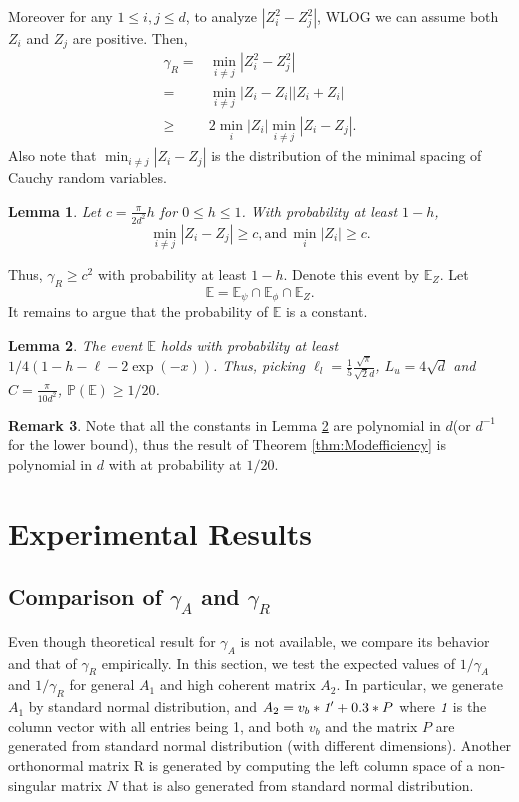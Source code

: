 \documentclass[twoside]{article}
\newcommand{\Ephione}{\mathbb{E}_{\phi_1}}
\newcommand{\Epsi}{\mathbb{E}_{\psi}}
\newcommand{\Ephi}{\mathbb{E}_{\phi}}
\newcommand{\EZ}{\mathbb{E}_{Z}}
\newcommand{\E}{\mathbb{E}}
\newcommand{\Prob}[1]{\mathbb{P}\left(#1\right)}
\newtheorem{lemma}{Lemma}[section]
\theoremstyle{definition}
\newtheorem{remark}[lemma]{Remark}
\begin{document}
Moreover for any $1\le i, j \le d$, to analyze $\left\vert Z_i^2 - Z_j^2\right\vert
$, WLOG we can assume both $Z_i$ and $Z_j$ are positive. Then, 
\begin{align*}
\gamma_R =	& \min_{i\neq j} \left\vert Z_i^2 - Z_j^2 \right\vert \\
	=		& \min_{i\neq j}\left\vert Z_i - Z_i \right\vert	\left\vert Z_i + Z_i \right\vert \\
	\ge 	& 2\min_i\vert Z_i\vert\min_{i\neq j} \left\vert Z_i - Z_j \right\vert.
\end{align*}
Also note that $\min_{i\neq j} \left\vert Z_i - Z_j \right\vert$ is the distribution of the minimal spacing of Cauchy random variables.

\begin{lemma}
\label{lem:CauchyGap}
Let $c = \frac{\pi}{2d^2}h$ for $0\le h\le 1$. 
With probability at least $1-h$,
\[
\min_{i\neq j} \left\vert Z_i - Z_j \right\vert \ge c, \text{and} \,  \min_i\vert Z_i\vert \ge c.
\]
\end{lemma}
Thus, $\gamma_R \ge c^2$ with probability at least $1-h$.
Denote this event by $\EZ$.
Let  
\[
\E = \Epsi \cap\Ephi \cap \EZ.
\]
It remains to argue that the probability of $\E$ is a constant.
\begin{lemma}
\label{lem:ConstantProb}
The event $\E$ holds with probability at least $1/4\left(1-h-\ell-2\exp(-x) \right)$. 
Thus, picking $\ell_l = \frac{1}{5}\frac{\sqrt{\pi}}{\sqrt{2}d}$, $L_u = 4\sqrt{d}$ and $C = \frac{\pi}{10d^2}$, $\Prob{\E}\ge 1/20$.
\end{lemma}
\begin{remark}
Note that all the constants in Lemma \ref{lem:ConstantProb} are polynomial in $d$(or $d^{-1}$ for the lower bound), thus the result of Theorem \ref{thm:Modefficiency} is polynomial in $d$ with at probability at $1/20$.
\end{remark}
 
\section{Experimental Results}
\label{sec:ExpRes}
\subsection{Comparison of $\gamma_A$ and $\gamma_R$}
\label{subsec:comparisonGamma}
Even though theoretical result for $\gamma_A$ is not available, we compare its behavior and that of $\gamma_R$ empirically. 
In this section, we test the expected values of $1/\gamma_A$ and $1/\gamma_R$ for general $A_1$ and high coherent matrix $A_2$. 
In particular, we generate $A_1$ by standard normal distribution, and $A_2 = v_b*\emph{1}' + 0.3*P$ where $\emph{1}$ is the column vector with all entries being 1, and both $v_b$ and the matrix $P$ are generated from standard normal distribution (with different dimensions). 
Another orthonormal matrix R is generated by computing the left column space of a non-singular matrix $N$ that is also generated from  standard normal distribution.  
\end{document}

